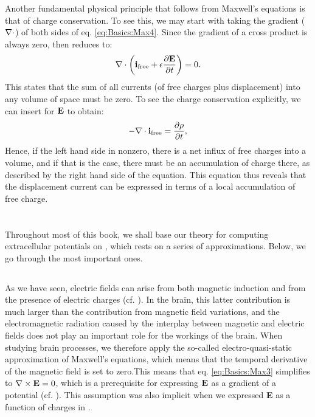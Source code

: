 Another fundamental physical principle that follows from Maxwell's equations is that of charge conservation. To see this, we may start with taking the gradient (${\bf \nabla} \cdot$) of both sides of eq. \ref{eq:Basics:Max4}. 
Since the gradient of a cross product is always zero,  then reduces to:
\begin{equation}
{\bf \nabla} \cdot \left( {\bf i}_\text{free} +  \epsilon \frac{\partial {\bf E}}{\partial t} \right) = 0.
\label{eq:Basics:Max4dot}
\end{equation}
This states that the sum of all currents (of free charges plus displacement) into any volume of space must be zero. To see the charge conservation explicitly, we can insert  for ${\bf E}$ to obtain:
\begin{equation}
- {\bf \nabla} \cdot {\bf i}_\text{free} =  \frac{\partial \rho}{\partial t},
\label{eq:Basics:currentconservation}
\end{equation}
Hence, if the left hand side in nonzero, there is a net influx of free charges into a volume, and if that is the case, there must be an accumulation of charge there, as described by the right hand side of the equation. This equation thus reveals that the displacement current can be expressed in terms of a local accumulation of free charge.


\section{}
Throughout most of this book, we shall base our theory for computing extracellular potentials on , which rests on a series of approximations. Below, we go through the most important ones.


\subsection{}
\label{sec:Basics:Quasielectrostatic} 
As we have seen, electric fields can arise from both magnetic induction and from the presence of electric charges (cf. ). In the brain, this latter contribution is much larger than the contribution from magnetic field variations, and the electromagnetic radiation caused by the interplay between magnetic and electric fields does not play an important role for the workings of the brain. When studying brain processes, we therefore apply the so-called electro-quasi-static approximation of Maxwell's equations, which means that the temporal derivative of the magnetic field is set to zero.This means that eq. \ref{eq:Basics:Max3} simplifies to ${\bf \nabla} \times {\bf E} = 0$, which is a prerequisite for expressing ${\bf E}$ as a gradient of a potential (cf. ). This assumption was also implicit when we expressed {\bf E} as a function of charges in .


